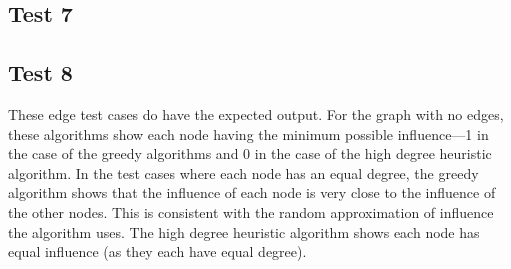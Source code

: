 \documentclass{article}
\begin{document}
\subsection{Test 7}
    \begin{center}
    \end{center}
\subsection{Test 8}
    \begin{center}
    \end{center}

These edge test cases do have the expected output.  For the graph with no edges, these algorithms show each node having the minimum possible influence---1 in the case of the greedy algorithms and 0 in the case of the high degree heuristic algorithm.  In the test cases where each node has an equal degree, the greedy algorithm shows that the influence of each node is very close to the influence of the other nodes.  This is consistent with the random approximation of influence the algorithm uses.  The high degree heuristic algorithm shows each node has equal influence (as they each have equal degree).
\end{document}
